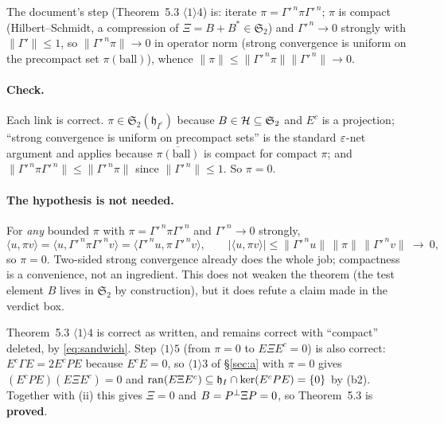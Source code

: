 \documentclass[11pt]{article}
\newcommand{\Stwo}{\mathfrak S_2}\newcommand{\Sone}{\mathfrak S_1}
\newcommand{\norm}[1]{\lVert #1\rVert}\newcommand{\abs}[1]{\lvert #1\rvert}
\newcommand{\ip}[2]{\langle #1,#2\rangle}\newcommand{\one}{\mathbf 1}
\begin{document}
The document's step (Theorem~5.3 $\langle1\rangle4$) is: iterate $\pi=\Gamma'^{\,n}\pi\Gamma'^{\,n}$;
$\pi$ is compact (Hilbert--Schmidt, a compression of $\Xi=B+B^*\in\Stwo$) and
$\Gamma'^{\,n}\to0$ strongly with $\norm{\Gamma'}\le1$, so $\norm{\Gamma'^{\,n}\pi}\to0$ in
operator norm (strong convergence is uniform on the precompact set $\pi(\text{ball})$),
whence $\norm\pi\le\norm{\Gamma'^{\,n}\pi}\norm{\Gamma'^{\,n}}\to0$.

\paragraph{Check.}  Each link is correct.  $\pi\in\Stwo(\mathfrak h_{I^c})$ because
$B\in\cH\subseteq\Stwo$ and $E^c$ is a projection; ``strong convergence is uniform on
precompact sets'' is the standard $\varepsilon$-net argument and applies because
$\overline{\pi(\text{ball})}$ is compact for compact $\pi$; and
$\norm{\Gamma'^{\,n}\pi\Gamma'^{\,n}}\le\norm{\Gamma'^{\,n}\pi}$ since
$\norm{\Gamma'^{\,n}}\le1$.  So $\pi=0$.

\paragraph{The hypothesis is not needed.}  For \emph{any} bounded $\pi$ with
$\pi=\Gamma'^{\,n}\pi\Gamma'^{\,n}$ and $\Gamma'^{\,n}\to0$ strongly,
\begin{equation}\label{eq:sandwich}
 \ip u{\pi v}=\ip u{\Gamma'^{\,n}\pi\Gamma'^{\,n}v}=\ip{\Gamma'^{\,n}u}{\pi\,\Gamma'^{\,n}v},
 \qquad
 \lvert\ip u{\pi v}\rvert\le\norm{\Gamma'^{\,n}u}\,\norm\pi\,\norm{\Gamma'^{\,n}v}\ \longrightarrow\ 0 ,
\end{equation}
so $\pi=0$.  Two-sided strong convergence already does the whole job; compactness is a
convenience, not an ingredient.  This does not weaken the theorem (the test element $B$
lives in $\Stwo$ by construction), but it does refute a claim made in the verdict box.

\begin{verdictok}
Theorem~5.3 $\langle1\rangle4$ is correct as written, and remains correct with
``compact'' deleted, by \eqref{eq:sandwich}.  Step $\langle1\rangle5$ (from $\pi=0$ to
$E\Xi E^c=0$) is also correct: $E^c\Gamma E=2E^cPE$ because $E^cE=0$, so
$\langle1\rangle3$ of \S\ref{sec:a} with $\pi=0$ gives $(E^cPE)(E\Xi E^c)=0$ and
$\operatorname{ran}(E\Xi E^c)\subseteq\mathfrak h_I\cap\ker(E^cPE)=\{0\}$ by (b2).  Together with (ii)
this gives $\Xi=0$ and $B=P^{\perp}\Xi P=0$, so Theorem~5.3 is \textbf{proved}.
\end{verdictok}
\end{document}
